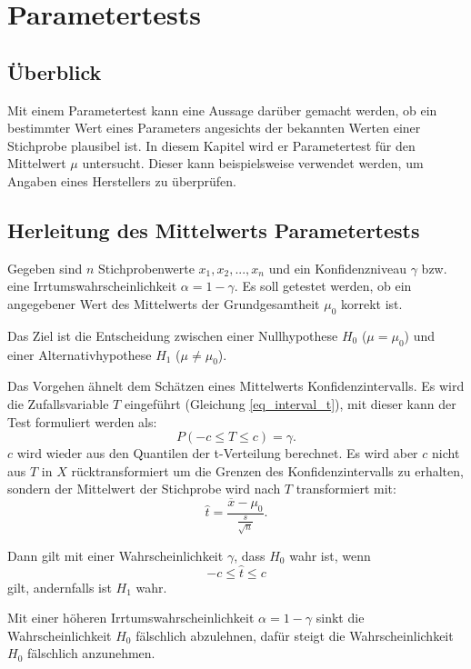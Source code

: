 \documentclass[10pt,twocolumn]{scrartcl}
\begin{document}
\section{Parametertests}
	\subsection{Überblick}
		Mit einem Parametertest kann eine Aussage darüber gemacht werden, ob ein bestimmter Wert eines Parameters angesichts der bekannten Werten einer Stichprobe plausibel ist. In diesem Kapitel wird er Parametertest für den Mittelwert $\mu$ untersucht. Dieser kann beispielsweise verwendet werden, um Angaben eines Herstellers zu überprüfen.
	\subsection{Herleitung des Mittelwerts Parametertests}
		Gegeben sind $n$ Stichprobenwerte $x_1, x_2, ..., x_n$ und ein Konfidenzniveau $\gamma$ bzw. eine Irrtumswahrscheinlichkeit $\alpha = 1 - \gamma$. Es soll getestet werden, ob ein angegebener Wert des Mittelwerts der Grundgesamtheit $\mu_0$ korrekt ist.

		Das Ziel ist die Entscheidung zwischen einer Nullhypothese $H_0$ ($\mu = \mu_0$) und einer Alternativhypothese $H_1$ ($\mu \ne \mu_0$).

		Das Vorgehen ähnelt dem Schätzen eines Mittelwerts Konfidenzintervalls. Es wird die Zufallsvariable $T$ eingeführt (Gleichung \ref{eq_interval_t}), mit dieser kann der Test formuliert werden als:
		\begin{equation}
		P(-c \le T \le c) = \gamma .
		\end{equation}
		$c$ wird wieder aus den Quantilen der t-Verteilung berechnet. Es wird aber $c$ nicht aus $T$ in $X$ rücktransformiert um die Grenzen des Konfidenzintervalls zu erhalten, sondern der Mittelwert der Stichprobe wird nach $T$ transformiert mit:
		\begin{equation}
		\hat{t} = \frac{\overline{x} - \mu_0}{\frac{s}{\sqrt{n}}} .
		\end{equation}

		Dann gilt mit einer Wahrscheinlichkeit $\gamma$, dass $H_0$ wahr ist, wenn
		\begin{equation}
		-c \le \hat{t} \le c
		\end{equation}
		gilt, andernfalls ist $H_1$ wahr.

		Mit einer höheren Irrtumswahrscheinlichkeit $\alpha = 1 - \gamma$ sinkt die Wahrscheinlichkeit $H_0$ fälschlich abzulehnen, dafür steigt die Wahrscheinlichkeit $H_0$ fälschlich anzunehmen.
\end{document}
